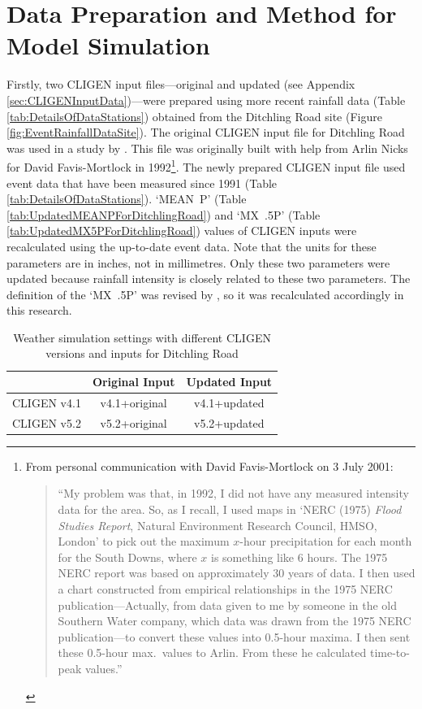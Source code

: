 \section{Data Preparation and Method for Model Simulation}
\label{sec:ImprovedCligenMethods}
Firstly, two CLIGEN input files---original and updated (see Appendix
\ref{sec:CLIGENInputData})---were prepared using more recent rainfall data
(Table \ref{tab:DetailsOfDataStations}) obtained from the Ditchling Road site
(Figure \ref{fig:EventRainfallDataSite}). The original CLIGEN input file for
Ditchling Road was used in a study by \citet{favis-mortlock1998-141}. This file
was originally built with help from Arlin Nicks for David Favis-Mortlock in
1992\footnote{From personal communication with David Favis-Mortlock on 3 July
2001: \begin{quotation} ``My problem was that, in 1992, I did not have any
measured intensity data for the area. So, as I recall, I used maps in `NERC
(1975) \textit{Flood Studies Report}, Natural Environment Research Council,
HMSO, London' to pick out the maximum $x$-hour precipitation for each month for
the South Downs, where $x$ is something like 6 hours. The 1975 NERC report was
based on approximately 30 years of data. I then used a chart constructed from
empirical relationships in the 1975 NERC publication---Actually, from data given
to me by someone in the old Southern Water company, which data was drawn from
the 1975 NERC publication---to convert these values into 0.5-hour maxima. I then
sent these 0.5-hour max.\ values to Arlin. From these he calculated time-to-peak
values.'' \end{quotation}}. The newly prepared CLIGEN input file used event data
that have been measured since 1991 (Table \ref{tab:DetailsOfDataStations}).
`MEAN~P' (Table \ref{tab:UpdatedMEANPForDitchlingRoad}) and `MX~.5P' (Table
\ref{tab:UpdatedMX5PForDitchlingRoad}) values of CLIGEN inputs were recalculated
using the up-to-date event data. Note that the units for these parameters are in
inches, not in millimetres. Only these two parameters were updated because
rainfall intensity is closely related to these two parameters. The definition of
the `MX~.5P' was revised by \citet{yu2000-301}, so it was recalculated
accordingly in this research.

\begin{table}[htbp]
  \centering
  \small
  \caption{Weather simulation settings with different CLIGEN versions and inputs
for Ditchling Road}
  \label{tab:CLIGENSimulationSettingsWithDifferentInputsAndVersions}
  \begin{tabular}{ccc}
  \toprule
        & Original Input & Updated Input \\
  \midrule
  CLIGEN v4.1 & v4.1+original & v4.1+updated \\
  \midrule
  CLIGEN v5.2 & v5.2+original & v5.2+updated \\
  \bottomrule
  \end{tabular}
\end{table}

